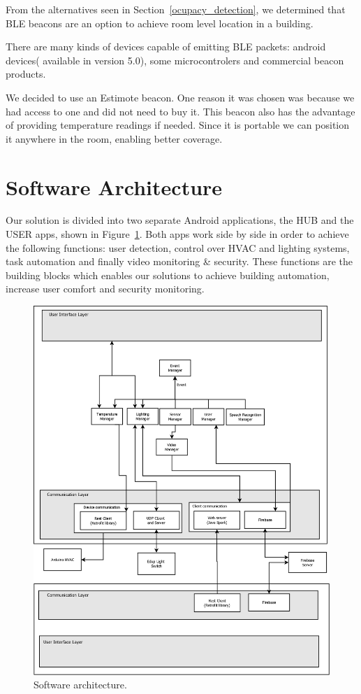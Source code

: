 From the alternatives seen in Section~\ref{ocupacy_detection}, we  determined that \ac{BLE} beacons are an option to achieve room level location in a building.

There are many kinds of devices capable of emitting \ac{BLE} packets: android devices( available in version 5.0), some microcontrolers and commercial beacon products.

We decided to use an Estimote beacon. One reason it was chosen was because we had access to one and did not need to buy it. This beacon also has the advantage of providing temperature readings if needed. Since it is portable we can position it anywhere in the room, enabling better coverage.


\section{Software Architecture}


Our solution is divided into two separate Android applications, the HUB and the USER apps, shown in Figure~\ref{imp:software}. Both apps work side by side in order to achieve the following functions: user detection, control over \ac{HVAC} and lighting systems, task automation and finally video monitoring \& security. These functions are the building blocks which enables our solutions to achieve building automation, increase user comfort and security monitoring.

\begin{figure}[H]
\centering
\includegraphics[width=1\textwidth]{Figures/software_dia}
\caption{Software architecture.}
\label{imp:software}
\end{figure}

